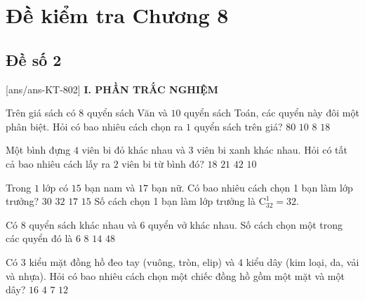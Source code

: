 \section*{Đề kiểm tra Chương 8}
\subsection*{Đề số 2}
\setcounter{ex}{0}\setcounter{bt}{0}
[ans/ans-KT-802]
\noindent\textbf{I. PHẦN TRẮC NGHIỆM}
\begin{ex}%
	Trên giá sách có $ 8 $ quyển sách Văn và $ 10 $ quyển sách Toán, các quyển này đôi một phân
	biệt. Hỏi có bao nhiêu cách chọn ra $ 1 $ quyển sách trên giá?
	\choice
	{$ 80 $}
	{$ 10 $}
	{$ 8 $}
	{\True $ 18 $}
\end{ex}

\begin{ex}%
	Một bình đựng $4$ viên bi đỏ khác nhau và $3$ viên bi xanh khác nhau. Hỏi có tất cả bao nhiêu cách lấy ra $2$ viên bi từ bình đó?
	\choice
	{$18$}
	{\True $21$}
	{$42$}
	{$10$}
\end{ex}
\begin{ex}%
	Trong $1$ lớp có $15$ bạn nam và $17$ bạn nữ. Có bao nhiêu cách chọn 1 bạn làm lớp trưởng?	
	\choice
	{$30$}
	{\True $32$}
	{$17$}
	{$15$}
	\loigiai
	{
		Số cách chọn 1 bạn làm lớp trưởng là $\mathrm{C}_{32}^1=32$.
	}
\end{ex}

\begin{ex}%
	Có $8$ quyển sách khác nhau và $6$ quyển vở khác nhau. Số cách chọn một trong các quyển đó là
	\choice
	{$6$}
	{$8$}
	{\True $14$}
	{$48$}
\end{ex}
\begin{ex}%
	Có $3$ kiểu mặt đồng hồ đeo tay (vuông, tròn, elip) và $4$ kiểu dây (kim loại, da, vải và nhựa). Hỏi có bao nhiêu cách chọn một chiếc đồng hồ gồm một mặt và một dây?
	\choice
	{$16$}
	{$4$}
	{$7$}
	{\True $12$}
\end{ex}





